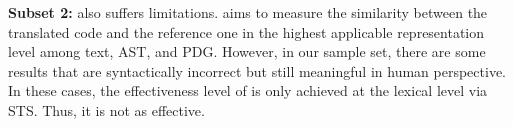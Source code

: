 \noindent \textbf{Subset 2:}
{\model} also suffers limitations. {\model} aims to measure the
similarity between the translated code and the reference one in the
highest applicable representation level among text, AST, and
PDG. However, in our sample set, there are some results that are
syntactically incorrect but still meaningful in human perspective. In
these cases, the effectiveness level of {\model} is only achieved at
the lexical level via STS. Thus, it is not as effective.



